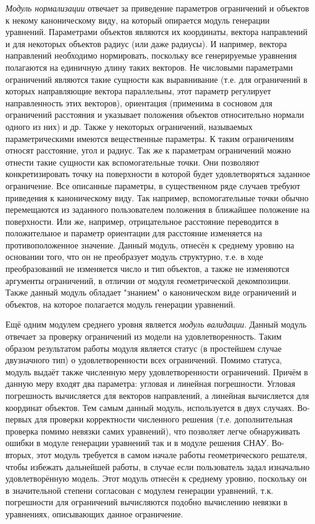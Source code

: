 \textit{Модуль нормализации} отвечает за приведение параметров ограничений и объектов к некому каноническому виду, на который опирается модуль генерации уравнений. Параметрами объектов являются их координаты, вектора направлений и для некоторых объектов радиус (или даже радиусы). И например, вектора направлений необходимо нормировать, поскольку все генерируемые уравнения полагаются на единичную длину таких векторов. Не числовыми параметрами ограничений являются такие сущности как выравнивание (т.е. для ограничений в которых направляющие вектора параллельны, этот параметр регулирует направленность этих векторов), ориентация (применима в сосновом для ограничений расстояния и указывает положения объектов относительно нормали одного из них) и др. Также у некоторых ограничений, называемых параметрическими имеются вещественные параметры. К таким ограничениям относят расстояние, угол и радиус. Так же к параметрам ограничений можно отнести такие сущности как вспомогательные точки. Они позволяют конкретизировать точку на поверхности в которой будет удовлетворяться заданное ограничение. Все описанные параметры, в существенном ряде случаев требуют приведения к каноническому виду. Так например, вспомогательные точки обычно перемещаются из заданного пользователем положения в ближайшее положение на поверхности. Или же, например, отрицательное расстояние переводится в положительное и параметр ориентации для расстояние изменяется на противоположенное значение. Данный модуль, отнесён к среднему уровню на основании того, что он не преобразует модуль структурно, т.е. в ходе преобразований не изменяется число и тип объектов, а также не изменяются аргументы ограничений, в отличии от модуля геометрической декомпозиции. Также данный модуль обладает "знанием" о каноническом виде ограничений и объектов, на которое полагается модуль генерации уравнений. 

Ещё одним модулем среднего уровня является \textit{модуль валидации}. Данный модуль отвечает за проверку ограничений из модели на удовлетворенность. Таким образом результатом работы модуля является статус (в простейшем случае двузначного тип) о удовлетворенности всех ограничений. Помимо статуса, модуль выдаёт также численную меру удовлетворенности ограничений. Причём в данную меру входят два параметра: угловая и линейная погрешности. Угловая погрешность вычисляется для векторов направлений, а линейная вычисляется для координат объектов. Тем самым данный модуль, используется в двух случаях. Во-первых для проверки корректности численного решения (т.е. дополнительная проверка помимо невязки самих уравнений), что позволяет легче обнаруживать ошибки в модуле генерации уравнений так и в модуле решения СНАУ. Во-вторых, этот модуль требуется в самом начале работы геометрического решателя, чтобы избежать дальнейшей работы, в случае если пользователь задал изначально удовлетворённую модель. Этот модуль отнесён к среднему уровню, поскольку он в значительной степени согласован с модулем генерации уравнений, т.к. погрешности для ограничений вычисляются подобно вычислению невязки в уравнениях, описывающих данное ограничение.




